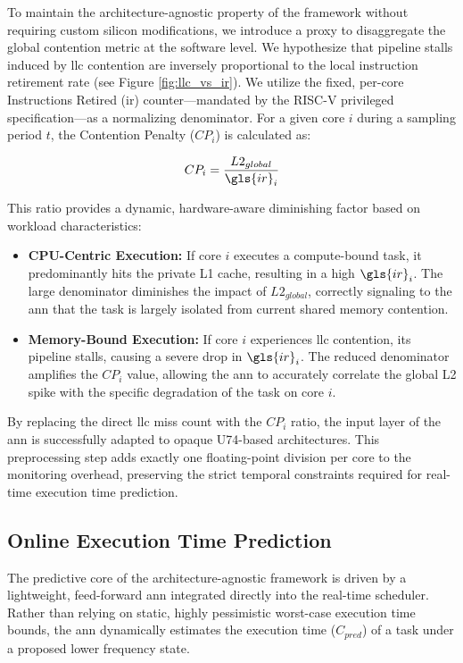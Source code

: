 \documentclass[conference]{IEEEtran}
\begin{document}
To maintain the architecture-agnostic property of the framework without requiring custom silicon modifications, we introduce a proxy to disaggregate the global contention metric at the software level. We hypothesize that pipeline stalls induced by \gls{llc} contention are inversely proportional to the local instruction retirement rate (see Figure \ref{fig:llc_vs_ir}). We utilize the fixed, per-core Instructions Retired (\gls{ir}) counter—mandated by the RISC-V privileged specification—as a normalizing denominator. For a given core $i$ during a sampling period $t$, the Contention Penalty ($CP_i$) is calculated as:

\begin{equation}
    CP_i = \frac{L2_{global}}{\gls{ir}_i}
\end{equation}

This ratio provides a dynamic, hardware-aware diminishing factor based on workload characteristics:
\begin{itemize}
    \item \textbf{CPU-Centric Execution:} If core $i$ executes a compute-bound task, it predominantly hits the private L1 cache, resulting in a high $\gls{ir}_i$. The large denominator diminishes the impact of $L2_{global}$, correctly signaling to the \gls{ann} that the task is largely isolated from current shared memory contention.
    \item \textbf{Memory-Bound Execution:} If core $i$ experiences \gls{llc} contention, its pipeline stalls, causing a severe drop in $\gls{ir}_i$. The reduced denominator amplifies the $CP_i$ value, allowing the \gls{ann} to accurately correlate the global L2 spike with the specific degradation of the task on core $i$.
\end{itemize}

By replacing the direct \gls{llc} miss count with the $CP_i$ ratio, the input layer of the \gls{ann} is successfully adapted to opaque U74-based architectures. This preprocessing step adds exactly one floating-point division per core to the monitoring overhead, preserving the strict temporal constraints required for real-time execution time prediction.

\subsection{Online Execution Time Prediction}
The predictive core of the architecture-agnostic framework is driven by a lightweight, feed-forward \gls{ann} integrated directly into the real-time scheduler. Rather than relying on static, highly pessimistic worst-case execution time bounds, the \gls{ann} dynamically estimates the execution time ($C_{pred}$) of a task under a proposed lower frequency state. 
\end{document}
